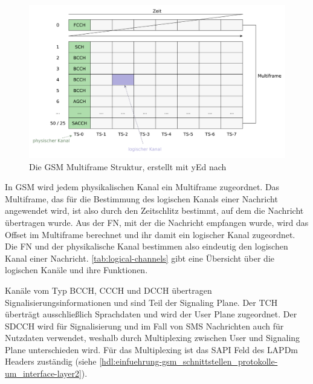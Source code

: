 \begin{figure}[H]
  \begin{center}
    \includegraphics[width=1.0\textwidth]{figures/gsm_multiframe.pdf}
  \end{center}
  \caption[Die GSM Multiframe Struktur]{Die \ac{GSM} Multiframe Struktur, erstellt mit yEd nach \citep[Kap. 1.7.3]{sauter:2011:grundkurs-mobile}} \label{fig:gsm-multiframe} 
\end{figure}

In \ac{GSM} wird jedem physikalischen Kanal ein Multiframe zugeordnet. Das Multiframe, das für die Bestimmung des logischen Kanals einer Nachricht angewendet wird, ist also durch den Zeitschlitz bestimmt, auf dem die Nachricht übertragen wurde. Aus der \ac{FN}, mit der die Nachricht empfangen wurde, wird das Offset im Multiframe berechnet und ihr damit ein logischer Kanal zugeordnet. Die \ac{FN} und der physikalische Kanal bestimmen also eindeutig den logischen Kanal einer Nachricht. \autoref{tab:logical-channels} gibt eine Übersicht über die logischen Kanäle und ihre Funktionen.

Kanäle vom Typ \ac{BCCH}, \ac{CCCH} und \ac{DCCH} übertragen Signalisierungsinformationen und sind Teil der Signaling Plane. Der \ac{TCH} überträgt ausschließlich Sprachdaten und wird der User Plane zugeordnet. Der \ac{SDCCH} wird für Signalisierung und im Fall von \ac{SMS} Nachrichten auch für Nutzdaten verwendet, weshalb durch Multiplexing zwischen User und Signaling Plane unterschieden wird. Für das Multiplexing ist das \ac{SAPI} Feld des \ac{LAPDm} Headers zuständig (siehe \autoref{hdl:einfuehrung-gsm_schnittstellen_protokolle-um_interface-layer2}).

